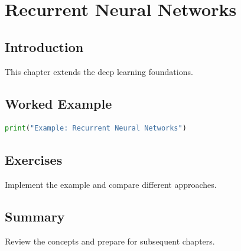 \chapter{Recurrent Neural Networks}
\label{chap:vol7-10}



\section{Introduction}
This chapter extends the deep learning foundations.

\section{Worked Example}
\begin{lstlisting}[language=Python]
print("Example: Recurrent Neural Networks")
\end{lstlisting}

\section{Exercises}
\begin{exercise}
Implement the example and compare different approaches.
\end{exercise}

\section{Summary}
Review the concepts and prepare for subsequent chapters.
